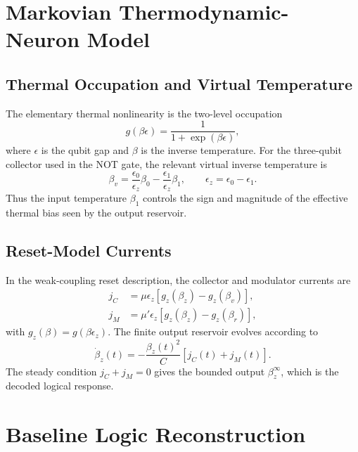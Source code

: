 \documentclass[11pt]{article}
\begin{document}
\section{Markovian Thermodynamic-Neuron Model}

\subsection{Thermal Occupation and Virtual Temperature}

The elementary thermal nonlinearity is the two-level occupation
\begin{equation}
    g(\beta\epsilon)=\frac{1}{1+\exp(\beta\epsilon)} ,
    \label{eq:fermi}
\end{equation}
where $\epsilon$ is the qubit gap and $\beta$ is the inverse temperature.  For the
three-qubit collector used in the NOT gate, the relevant virtual inverse temperature is
\begin{equation}
    \beta_v
    =
    \frac{\epsilon_0}{\epsilon_z}\beta_0
    -
    \frac{\epsilon_1}{\epsilon_z}\beta_1,
    \qquad
    \epsilon_z=\epsilon_0-\epsilon_1 .
    \label{eq:virtual-temperature}
\end{equation}
Thus the input temperature $\beta_1$ controls the sign and magnitude of the effective
thermal bias seen by the output reservoir.

\subsection{Reset-Model Currents}

In the weak-coupling reset description, the collector and modulator currents are
\begin{align}
    j_C &=
    \mu\epsilon_z\left[g_z(\beta_z)-g_z(\beta_v)\right], \\
    j_M &=
    \mu'\epsilon_z\left[g_z(\beta_z)-g_z(\beta_r)\right],
\end{align}
with $g_z(\beta)=g(\beta\epsilon_z)$.  The finite output reservoir evolves according to
\begin{equation}
    \dot{\beta}_z(t)
    =
    -\frac{\beta_z(t)^2}{C}\left[j_C(t)+j_M(t)\right].
    \label{eq:beta-dynamics}
\end{equation}
The steady condition $j_C+j_M=0$ gives the bounded output $\beta_z^\infty$, which is the
decoded logical response.

\section{Baseline Logic Reconstruction}
\end{document}
